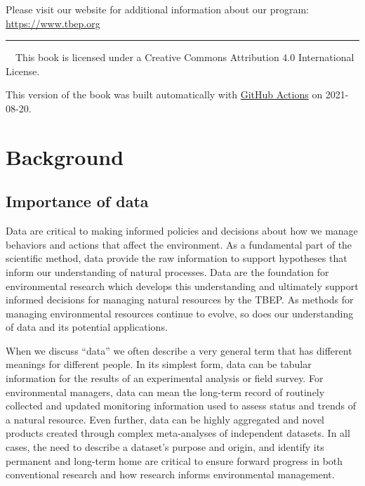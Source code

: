 \documentclass[
]{book}
\begin{document}
Please visit our website for additional information about our program: \url{https://www.tbep.org}

\begin{center}\rule{0.5\linewidth}{0.5pt}\end{center}

~~This book is licensed under a Creative Commons Attribution 4.0 International License.

This version of the book was built automatically with \href{https://github.com/tbep-tech/data-management-sop/actions}{GitHub Actions} on 2021-08-20.

\hypertarget{background}{%
\chapter{Background}\label{background}}

\hypertarget{dataimp}{%
\section{Importance of data}\label{dataimp}}

Data are critical to making informed policies and decisions about how we manage behaviors and actions that affect the environment. As a fundamental part of the scientific method, data provide the raw information to support hypotheses that inform our understanding of natural processes. Data are the foundation for environmental research which develops this understanding and ultimately support informed decisions for managing natural resources by the TBEP. As methods for managing environmental resources continue to evolve, so does our understanding of data and its potential applications.

When we discuss ``data'' we often describe a very general term that has different meanings for different people. In its simplest form, data can be tabular information for the results of an experimental analysis or field survey. For environmental managers, data can mean the long-term record of routinely collected and updated monitoring information used to assess status and trends of a natural resource. Even further, data can be highly aggregated and novel products created through complex meta-analyses of independent datasets. In all cases, the need to describe a dataset's purpose and origin, and identify its permanent and long-term home are critical to ensure forward progress in both conventional research and how research informs environmental management.
\end{document}
